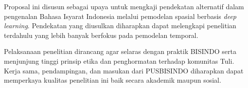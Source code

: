 Proposal ini disusun sebagai upaya untuk mengkaji pendekatan alternatif dalam pengenalan Bahasa Isyarat Indonesia melalui pemodelan spasial berbasis \textit{deep learning}.  
Pendekatan yang diusulkan diharapkan dapat melengkapi penelitian terdahulu yang lebih banyak berfokus pada pemodelan temporal.  

Pelaksanaan penelitian dirancang agar selaras dengan praktik BISINDO serta menjunjung tinggi prinsip etika dan penghormatan terhadap komunitas Tuli.  
Kerja sama, pendampingan, dan masukan dari PUSBISINDO diharapkan dapat memperkaya kualitas penelitian ini baik secara akademik maupun sosial.  